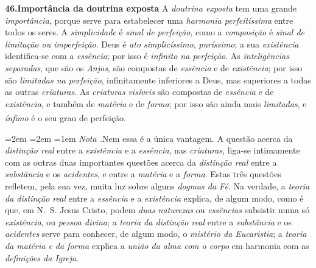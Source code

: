\documentclass[12pt,a4paper]{article}
\newcommand{\tese}[2]{\bigskip\noindent\textbf{#1.\quad #2}\;\textemdash\;}
\renewcommand\footnote[1]{%
    \stepcounter{footnote}\textsuperscript{\thefootnote}%
    \par
    {\footnotesize
     \leftskip=2em \rightskip=2em \parindent=1em
     \addvspace{\medskipamount}%
     \noindent\textit{Nota \thefootnote.}\enspace #1\par
     \addvspace{\medskipamount}}%
  }
\begin{document}
\tese{46}{Importância da doutrina exposta} A \emph{doutrina exposta} tem uma
grande \emph{importância}, porque serve para estabelecer uma \emph{harmonia
perfeitíssima} entre todos os seres. A \emph{simplicidade} é \emph{sinal de
perfeição}, como a \emph{composição} é \emph{sinal de limitação ou imperfeição}.
Deus é \emph{ato simplicíssimo}, \emph{puríssimo}; a sua \emph{existência}
identifica-se com a \emph{essência}; por isso é \emph{infinito na perfeição}.
\textemdash{} As \emph{inteligências separadas}, que são os \emph{Anjos}, são
compostas de \emph{essência} e de \emph{existência}; por isso são \emph{limitadas
na perfeição}, infinitamente inferiores a Deus, mas superiores a todas as outras
\emph{criaturas}. \textemdash{} As \emph{criaturas visíveis} são compostas de
\emph{essência} e de \emph{existência}, e também de \emph{matéria} e de
\emph{forma}; por isso são ainda mais \emph{limitadas}, e \emph{ínfimo} é o seu
grau de perfeição.\footnote{Nem essa é a única vantagem. A questão acerca da
\emph{distinção real} entre a \emph{existência} e a \emph{essência}, nas
\emph{criaturas}, liga-se intimamente com as outras duas importantes questões
acerca da \emph{distinção real} entre a \emph{substância} e os \emph{acidentes},
e entre a \emph{matéria} e a \emph{forma}. Estas três questões refletem, pela
sua vez, muita luz sobre alguns \emph{dogmas da Fé}. Na verdade, a \emph{teoria
da distinção real} entre a \emph{essência} e a \emph{existência} explica, de
algum modo, como é que, em N.~S. Jesus Cristo, podem \emph{duas naturezas} ou
\emph{essências} subsistir numa só \emph{existência}, ou \emph{pessoa divina};
\textemdash{} a \emph{teoria da distinção real} entre a \emph{substância} e os
\emph{acidentes} serve para conhecer, de algum modo, o \emph{mistério da
Eucaristia}; \textemdash{} a \emph{teoria da matéria e da forma} explica a
\emph{união da alma com o corpo} em harmonia com as \emph{definições da Igreja}.}
\end{document}
